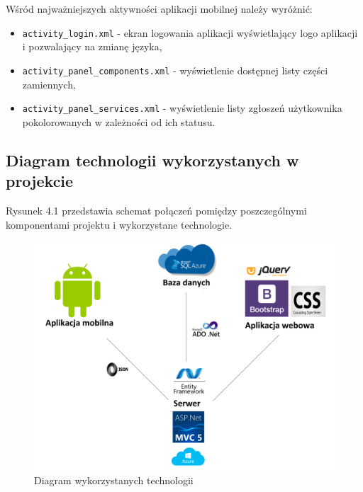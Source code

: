 \documentclass[a4paper,11pt]{article}
\begin{document}
Wśród najważniejszych aktywności aplikacji mobilnej należy wyróżnić:
\begin{itemize}
	\item \texttt{activity\_login.xml} - ekran logowania aplikacji  wyświetlający logo aplikacji i pozwalający na zmianę języka,
	\item \texttt{activity\_panel\_components.xml} - wyświetlenie dostępnej listy części zamiennych,
	\item \texttt{activity\_panel\_services.xml} - wyświetlenie listy zgłoszeń użytkownika pokolorowanych w zależności od ich statusu.
\end{itemize}
\subsection{Diagram technologii wykorzystanych w projekcie}
Rysunek 4.1 przedstawia schemat połączeń pomiędzy poszczególnymi komponentami projektu i wykorzystane technologie.
\begin{figure}[H]
	\centering
	\includegraphics[width=\textwidth,height=0.6\textheight]{diagramTechnologii.png}
	\caption{Diagram wykorzystanych technologii}
\end{figure}
\end{document}
